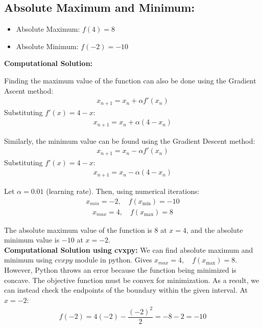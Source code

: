 \documentclass[journal]{IEEEtran}
\numberwithin{equation}{enumi}
\numberwithin{figure}{enumi}
\begin{document}
\subsection*{Absolute Maximum and Minimum:}
\begin{itemize}
    \item Absolute Maximum: $ f(4) = 8 $
    \item Absolute Minimum: $ f(-2) = -10 $
\end{itemize}

\textbf{Computational Solution:}

Finding the maximum value of the function can also be done using the Gradient Ascent method:
\begin{align}
x_{n+1} = x_n + \alpha f'(x_n)
\end{align}
Substituting $ f'(x) = 4 - x $:
\begin{align}
x_{n+1} = x_n + \alpha(4 - x_n)
\end{align}

Similarly, the minimum value can be found using the Gradient Descent method:
\begin{align}
x_{n+1} = x_n - \alpha f'(x_n)
\end{align}
Substituting $ f'(x) = 4 - x $:
\begin{align}
x_{n+1} = x_n - \alpha(4 - x_n)
\end{align}


Let $ \alpha = 0.01 $ (learning rate). Then, using numerical iterations:
\begin{align}
x_{min} = -2, \quad f(x_{\text{min}}) = -10
\end{align}
\begin{align}
x_{max} = 4, \quad f(x_{\text{max}}) = 8
\end{align}


The absolute maximum value of the function is $ 8 $ at $ x = 4 $, and the absolute minimum value is $ -10 $ at $ x = -2 $.\\
\textbf{Computational Solution using cvxpy:}
We can find absolute maximum and minimum using $cvxpy$ module in python. Gives $x_{max} = 4, \quad f(x_{\text{max}}) = 8$. However, Python throws an error because the function being minimized is concave. The objective function must be convex for minimization. As a result, we can instead check the endpoints of the boundary within the given interval. At  $ x = -2 $:
\begin{align}
f(-2) = 4(-2) - \dfrac{(-2)^2}{2} = -8 - 2 = -10
\end{align}
\end{document}
